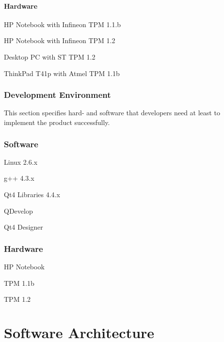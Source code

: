 \documentclass[
  american        %
]{sirrixreport}
\begin{document}
\subsubsection{Hardware}
\begin{compactitem}
 \item HP Notebook with Infineon TPM 1.1.b
 \item HP Notebook with Infineon TPM 1.2
 \item Desktop PC with ST TPM 1.2
 \item ThinkPad T41p with Atmel TPM 1.1b
\end{compactitem}

\subsection{Development Environment}

   This section specifies hard- and software that developers need at
   least to implement the product successfully.

\subsection{Software}
\begin{compactitem}
 \item Linux 2.6.x
 \item g++ 4.3.x
 \item Qt4 Libraries 4.4.x
 \item QDevelop
 \item Qt4 Designer
\end{compactitem}

\subsection{Hardware}
\begin{compactitem}
 \item HP Notebook
 \item TPM 1.1b
 \item TPM 1.2
\end{compactitem}

\chapter{Software Architecture}
\label{chap:architecture}
\end{document}
